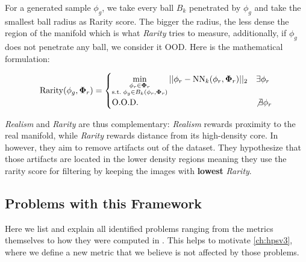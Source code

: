%
For a generated sample $\phi_g$, we take every ball $B_k$ penetrated by $\phi_g$ and take the smallest ball radius as Rarity score. The bigger the radius, the less dense the region of the manifold which is what \emph{Rarity} tries to measure, additionally, if $\phi_g$ does not penetrate any ball, we consider it \acs{OOD}. Here is the mathematical formulation:

\begin{equation}
  \mathrm{Rarity}(\phi_{g}, \boldsymbol{\Phi}_r)=
  \begin{cases}
  \min\limits_{\substack{\phi_{r} \in \boldsymbol\Phi_{r} \\ \mathrm{s.t.} \;  \phi_{g} \in B_{k}(\phi_{r},\boldsymbol\Phi_{r})}}
  ||\phi_r - \mathrm{NN}_{k}(\phi_{r},\boldsymbol\Phi_{r})||_2 & \exists \phi_r\\
  \mathrm{O.O.D.} & \not\exists \phi_r
  \end{cases}
  \label{eq:rarity}
\end{equation}
%


\emph{Realism} and \emph{Rarity} are thus complementary: \emph{Realism} rewards proximity to the real manifold, while \emph{Rarity} rewards distance from its high-density core. 
In \cite{jazbec_generative_2025} however, they aim to remove artifacts out of the dataset. They hypothesize that those artifacts are located in the lower density regions meaning they use the rarity score for filtering by keeping the images with \textbf{lowest} \emph{Rarity}.

\subsection{Problems with this Framework}
\label{sub:problems_inception}

Here we list and explain all identified problems ranging from the metrics themselves to how they were computed in \cite{jazbec_generative_2025}. This helps to motivate \autoref{ch:hpsv3}, where we define a new metric that we believe is not affected by those problems.


